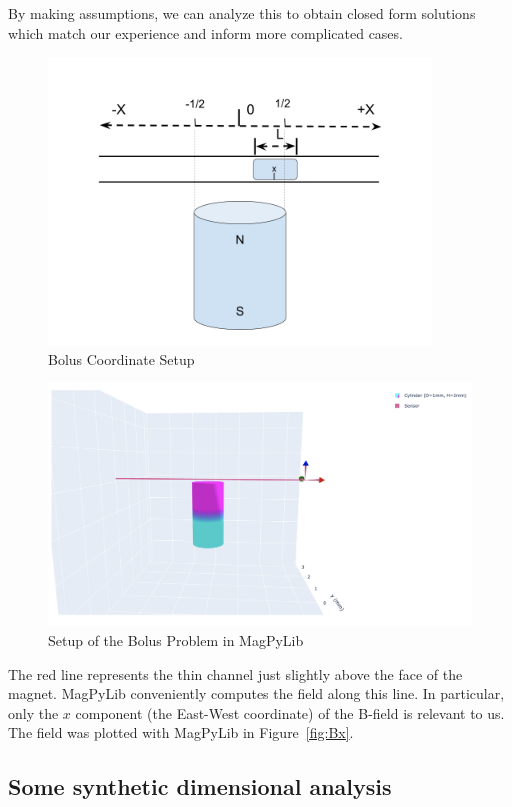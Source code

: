 \documentclass{asme2ej}
\begin{document}
By making assumptions, we can
analyze this to obtain closed form solutions which match our
experience and inform more complicated cases.

\begin{figure}[h]
\centerline{\includegraphics[width=4in]{figure/BolusSetup.png}}
\caption{Bolus Coordinate Setup}
\label{fig:BolusSetup}
\end{figure}


\begin{figure}[h]
\centerline{\includegraphics[width=6in]{figure/SetupBolusProblem.png}}
\caption{Setup of the Bolus Problem in MagPyLib}
\label{fig:BolusSetupMagPyLib}
\end{figure}

The red line represents the thin channel just slightly above the face of
the magnet.
MagPyLib conveniently computes the field along this line. In particular,
only the $x$ component (the East-West coordinate) of the B-field is relevant to us.
The field was plotted with MagPyLib in Figure~\ref{fig:Bx}.

\subsection{Some synthetic dimensional analysis}
\end{document}
